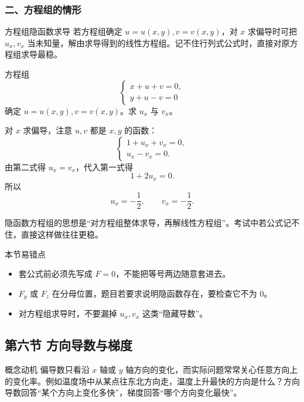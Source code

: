 \subsubsection*{二、方程组的情形}

\begin{methodbox}{方程组隐函数求导}
若方程组确定 $u=u(x,y),v=v(x,y)$，对 $x$ 求偏导时可把 $u_x,v_x$ 当未知量，解由求导得到的线性方程组。记不住行列式公式时，直接对原方程组求导最稳。
\end{methodbox}
\begin{problem}
方程组
\[
\begin{cases}
x+u+v=0,\\
y+u-v=0
\end{cases}
\]
确定 $u=u(x,y),v=v(x,y)$。求 $u_x$ 与 $v_x$。
\end{problem}
\begin{solution}
对 $x$ 求偏导，注意 $u,v$ 都是 $x,y$ 的函数：
\[
\begin{cases}
1+u_x+v_x=0,\\
u_x-v_x=0.
\end{cases}
\]
由第二式得 $u_x=v_x$，代入第一式得
\[
  1+2u_x=0.
\]
所以
\[
  u_x=-\frac12,\qquad v_x=-\frac12.
\]
\end{solution}
\begin{note}
隐函数方程组的思想是“对方程组整体求导，再解线性方程组”。考试中若公式记不住，直接这样做往往更稳。
\end{note}

\begin{warningbox}{本节易错点}
\begin{itemize}
  \item 套公式前必须先写成 $F=0$，不能把等号两边随意套进去。
  \item $F_y$ 或 $F_z$ 在分母位置，题目若要求说明隐函数存在，要检查它不为 $0$。
  \item 对方程组求导时，不要漏掉 $u_x,v_x$ 这类“隐藏导数”。
\end{itemize}
\end{warningbox}

\subsection{第六节 方向导数与梯度}

\begin{summarybox}{概念动机}
偏导数只看沿 $x$ 轴或 $y$ 轴方向的变化，而实际问题常常关心任意方向上的变化率。例如温度场中从某点往东北方向走，温度上升最快的方向是什么？方向导数回答“某个方向上变化多快”，梯度回答“哪个方向变化最快”。
\end{summarybox}

